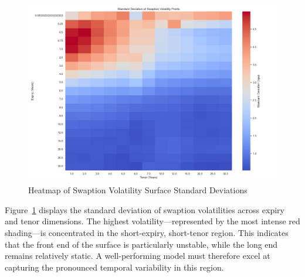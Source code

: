 \begin{figure}[H]
	\centering
	\includegraphics[width=1\textwidth]{images/descriptive_data_analysis/vol_surface_std_heatmap.png}
	\caption{Heatmap of Swaption Volatility Surface Standard Deviations}
	\label{fig:vol_surface_std_heatmap}
\end{figure}

Figure~\ref{fig:vol_surface_std_heatmap} displays the standard deviation of swaption volatilities across expiry and tenor dimensions. The highest volatility—represented by the most intense red shading—is concentrated in the short-expiry, short-tenor region. This indicates that the front end of the surface is particularly unstable, while the long end remains relatively static. A well-performing model must therefore excel at capturing the pronounced temporal variability in this region.

